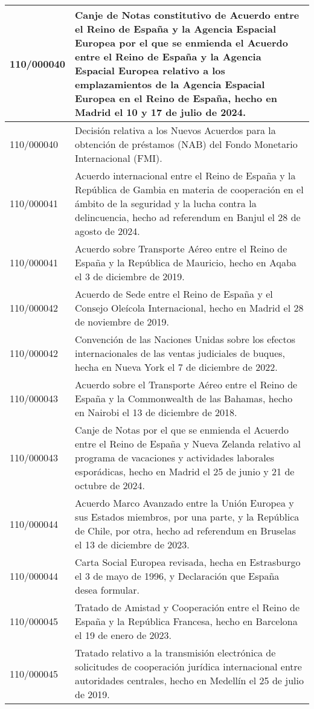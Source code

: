 {\begin{table}[H]
\begin{center}
\begin{tabularx}{\linewidth}{| l | X |}
\hline
110/000040 & Canje de Notas constitutivo de Acuerdo entre el Reino de España y la Agencia Espacial Europea por el que se enmienda el Acuerdo entre el Reino de España y la Agencia Espacial Europea relativo a los emplazamientos de la Agencia Espacial Europea en el Reino de España, hecho en Madrid el 10 y 17 de julio de 2024. \\
\hline
110/000040 & Decisión relativa a los Nuevos Acuerdos para la obtención de préstamos (NAB) del Fondo Monetario Internacional (FMI). \\
\hline
110/000041 & Acuerdo internacional entre el Reino de España y la República de Gambia en materia de cooperación en el ámbito de la seguridad y la lucha contra la delincuencia, hecho ad referendum en Banjul el 28 de agosto de 2024. \\
\hline
110/000041 & Acuerdo sobre Transporte Aéreo entre el Reino de España y la República de Mauricio, hecho en Aqaba el 3 de diciembre de 2019. \\
\hline
110/000042 & Acuerdo de Sede entre el Reino de España y el Consejo Oleícola Internacional, hecho en Madrid el 28 de noviembre de 2019. \\
\hline
110/000042 & Convención de las Naciones Unidas sobre los efectos internacionales de las ventas judiciales de buques, hecha en Nueva York el 7 de diciembre de 2022. \\
\hline
110/000043 & Acuerdo sobre el Transporte Aéreo entre el Reino de España y la Commonwealth de las Bahamas, hecho en Nairobi el 13 de diciembre de 2018. \\
\hline
110/000043 & Canje de Notas por el que se enmienda el Acuerdo entre el Reino de España y Nueva Zelanda relativo al programa de vacaciones y actividades laborales esporádicas, hecho en Madrid el 25 de junio y 21 de octubre de 2024. \\
\hline
110/000044 & Acuerdo Marco Avanzado entre la Unión Europea y sus Estados miembros, por una parte, y la República de Chile, por otra, hecho ad referendum en Bruselas el 13 de diciembre de 2023. \\
\hline
110/000044 & Carta Social Europea revisada, hecha en Estrasburgo el 3 de mayo de 1996, y Declaración que España desea formular. \\
\hline
110/000045 & Tratado de Amistad y Cooperación entre el Reino de España y la República Francesa, hecho en Barcelona el 19 de enero de 2023. \\
\hline
110/000045 & Tratado relativo a la transmisión electrónica de solicitudes de cooperación jurídica internacional entre autoridades centrales, hecho en Medellín el 25 de julio de 2019. \\

\end{tabularx}
\end{center}
\end{table}}
